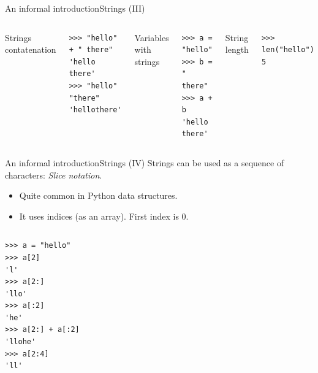 \documentclass[10pt,compress]{beamer} %
\begin{document}
\begin{frame}[fragile]{An informal introduction}{Strings (III)}
\vspace{-0.4cm}
	\begin{columns}
		Strings contatenation
				\begin{block}{}
				\begin{verbatim}
>>> "hello" + " there"
'hello there'
>>> "hello" "there"
'hellothere'
\end{verbatim}
				\end{block}

		Variables with strings
				\begin{block}{}
				\begin{verbatim}
>>> a = "hello"
>>> b = " there"
>>> a + b
'hello there'
\end{verbatim}
				\end{block}

		String length
				\begin{block}{}
				\begin{verbatim}
>>> len("hello")
5
\end{verbatim}
				\end{block}
		\end{columns}

\end{frame}

\begin{frame}[fragile]{An informal introduction}{Strings (IV)}
	\vspace{-0.2cm}
	Strings can be used as a sequence of characters: \textit{Slice notation}.
	\begin{itemize}
	\item Quite common in Python data structures.
	\item It uses indices (as an array). First index is $0$.
	\end{itemize}
	\vspace{-0.3cm}
	\begin{columns}
 	   			\column{.40\textwidth}
				\begin{block}{}
				\begin{verbatim}
>>> a = "hello"
>>> a[2]
'l'
>>> a[2:]
'llo'
>>> a[:2]
'he'
>>> a[2:] + a[:2]
'llohe'
>>> a[2:4]
'll'
\end{verbatim}
				\end{block}
		\end{columns}
\end{frame}
\end{document}
